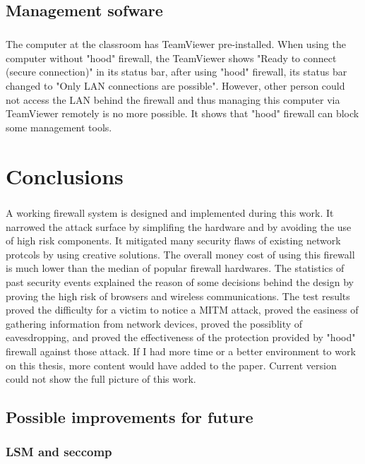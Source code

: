 \documentclass[mscthesis]{usiinfthesis}
\begin{document}
\section{Management sofware}
\paragraph{}
The computer at the classroom has TeamViewer pre-installed. When using the computer without "hood" firewall, the TeamViewer shows "Ready to connect (secure connection)" in its status bar, after using "hood" firewall, its status bar changed to "Only LAN connections are possible". However, other person could not access the LAN behind the firewall and thus managing this computer via TeamViewer remotely is no more possible. It shows that "hood" firewall can block some management tools.

\chapter{Conclusions}\label{cha:conclustion}
\paragraph{}
A working firewall system is designed and implemented during this work. It narrowed the attack surface by simplifing the hardware and by avoiding the use of high risk components. It mitigated many security flaws of existing network protcols by using creative solutions. The overall money cost of using this firewall is much lower than the median of popular firewall hardwares. The statistics of past security events explained the reason of some decisions behind the design by proving the high risk of browsers and wireless communications. The test results proved the difficulty for a victim to notice a MITM attack, proved the easiness of gathering information from network devices, proved the possiblity of eavesdropping, and proved the effectiveness of the protection provided by "hood" firewall against those attack. If I had more time or a better environment to work on this thesis, more content would have added to the paper. Current version could not show the full picture of this work.

\section{Possible improvements for future}
\subsection{LSM and seccomp}
\end{document}
